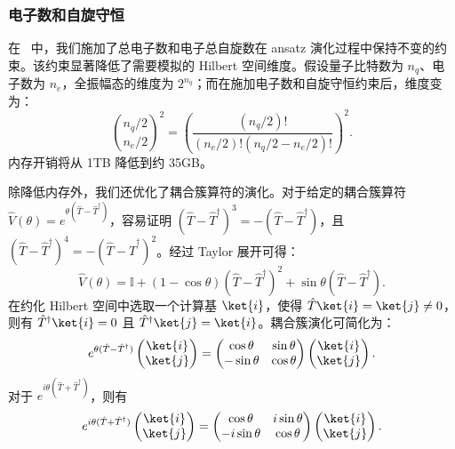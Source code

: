\subsubsection{电子数和自旋守恒}
在 \QuPack\ 中，我们施加了总电子数和电子总自旋数在 ansatz 演化过程中保持不变的约束。该约束显著降低了需要模拟的 Hilbert 空间维度。假设量子比特数为 $n_q$、电子数为 $n_e$，全振幅态的维度为 $2^{n_q}$；而在施加电子数和自旋守恒约束后，维度变为：
\begin{equation}
    \binom{n_q/2}{n_e/2}^2=\left(\frac{(n_q/2)!}{(n_e/2)!(n_q/2-n_e/2)!}\right)^2.
\end{equation}
内存开销将从 1TB 降低到约 35GB。

除降低内存外，我们还优化了耦合簇算符的演化。对于给定的耦合簇算符 $\hat{V}(\theta)=e^{\theta(\hat{T}-\hat{T}^\dagger)}$，容易证明 $(\hat{T}-\hat{T}^\dagger)^3 = - (\hat{T}-\hat{T}^\dagger)$，且 $(\hat{T}-\hat{T}^\dagger)^4 = -(\hat{T}-\hat{T}^\dagger)^2$。经过 Taylor 展开可得：
\begin{equation}
    \hat{V}(\theta) = \mathbb{I} + ( 1-\cos\theta)(\hat{T}-\hat{T}^\dagger)^2 + \sin\theta (\hat{T}-\hat{T}^\dagger).
\end{equation}
在约化 Hilbert 空间中选取一个计算基 $\ket{i}$，使得 $\hat{T}\ket{i} = \ket{j}\neq0$，则有 $\hat{T}^\dagger\ket{i}=0$ 且 $\hat{T}^\dagger\ket{j}=\ket{i}$。耦合簇演化可简化为：
\begin{equation}
    e^{\theta(\hat{T}-\hat{T}^\dagger)}\begin{pmatrix}
        \ket{i} \\\ket{j}
    \end{pmatrix}=\begin{pmatrix}
        \cos\theta  & \sin\theta \\
        -\sin\theta & \cos\theta
    \end{pmatrix}\begin{pmatrix}
        \ket{i} \\\ket{j}
    \end{pmatrix}.
\end{equation}
对于 $e^{i\theta(\hat{T}+\hat{T}^\dagger)}$，则有
\begin{equation}
    e^{i\theta(\hat{T}+\hat{T}^\dagger)}\begin{pmatrix}
        \ket{i} \\\ket{j}
    \end{pmatrix}=\begin{pmatrix}
        \cos\theta   & i\sin\theta \\
        -i\sin\theta & \cos\theta
    \end{pmatrix}\begin{pmatrix}
        \ket{i} \\\ket{j}
    \end{pmatrix}.
\end{equation}


